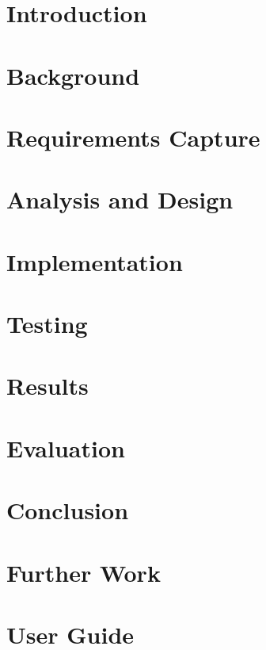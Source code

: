 \documentclass[12pt]{article}
\begin{document}
\section{Introduction}
\section{Background}
  
\section{Requirements Capture}
  
\section{Analysis and Design}
  
\section{Implementation}
\section{Testing}
\section{Results}
\section{Evaluation}
\section{Conclusion}
\section{Further Work}
\section{User Guide}

\newpage
\appendix

% 


\end{document}
